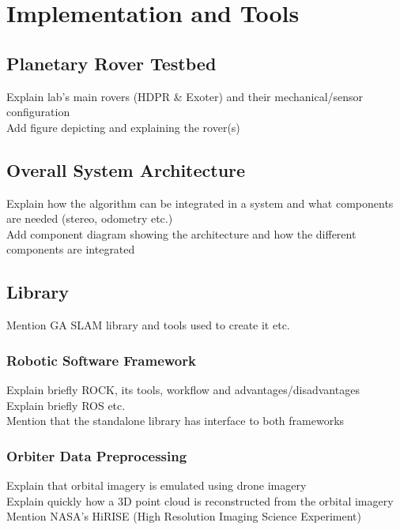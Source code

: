 \label{Chapter3}

\chapter{Implementation and Tools}

\section{Planetary Rover Testbed}

Explain lab's main rovers (HDPR \& Exoter) and their mechanical/sensor configuration\\
Add figure depicting and explaining the rover(s)


\section{Overall System Architecture}

Explain how the algorithm can be integrated in a system and what components are needed (stereo, odometry etc.)\\
Add component diagram showing the architecture and how the different components are integrated

\section{Library}

Mention GA SLAM library and tools used to create it etc.

\subsection{Robotic Software Framework}

Explain briefly ROCK, its tools, workflow and advantages/disadvantages\\
Explain briefly ROS etc.\\
Mention that the standalone library has interface to both frameworks


\subsection{Orbiter Data Preprocessing}

Explain that orbital imagery is emulated using drone imagery\\
Explain quickly how a 3D point cloud is reconstructed from the orbital imagery\\
Mention NASA's HiRISE (High Resolution Imaging Science Experiment)


